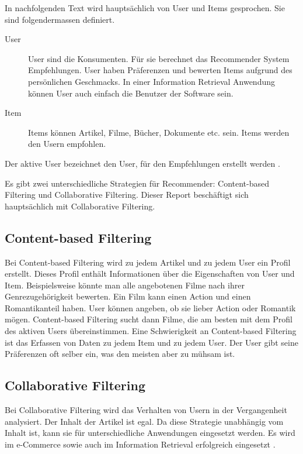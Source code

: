 \documentclass[a4paper, 12pt]{article}
\begin{document}
In nachfolgenden Text wird hauptsächlich von User und Items gesprochen. Sie sind folgendermassen definiert.

\begin{description}
\item[User] User sind die Konsumenten. Für sie berechnet das Recommender System Empfehlungen. 
User haben Präferenzen und bewerten Items aufgrund des persönlichen Geschmacks. In einer Information Retrieval Anwendung können User auch einfach die Benutzer der Software sein.
\item[Item] 
Items können Artikel, Filme, Bücher, Dokumente etc. sein. Items werden den Usern empfohlen.
\end{description}

Der aktive User bezeichnet den User, für den Empfehlungen erstellt werden \cite{jannach11}.

Es gibt zwei unterschiedliche Strategien für Recommender: Content-based Filtering und Collaborative Filtering. Dieser Report beschäftigt sich hauptsächlich mit Collaborative Filtering. 

\subsection{Content-based Filtering}
\label{sec:contentbased}

Bei Content-based Filtering wird zu jedem Artikel und zu jedem User ein Profil erstellt. Dieses Profil enthält Informationen über die Eigenschaften von User und Item. Beispielsweise könnte man alle angebotenen Filme nach ihrer Genrezugehörigkeit bewerten. Ein Film kann einen Action und einen Romantikanteil haben. User können angeben, ob sie lieber Action oder Romantik mögen. Content-based Filtering sucht dann Filme, die am besten mit dem Profil des aktiven Users übereinstimmen. Eine Schwierigkeit an Content-based Filtering ist das Erfassen von Daten zu jedem Item und zu jedem User. Der User gibt seine Präferenzen oft selber ein, was den meisten aber zu mühsam ist.

\subsection{Collaborative Filtering}
\label{sec:collaborativefiltering}

Bei Collaborative Filtering wird das Verhalten von Usern in der Vergangenheit analysiert. Der Inhalt der Artikel ist egal. Da diese Strategie unabhängig vom Inhalt ist, kann sie für unterschiedliche Anwendungen eingesetzt werden. Es wird im e-Commerce sowie auch im Information Retrieval erfolgreich eingesetzt \cite{sarwar01}. 
\end{document}

